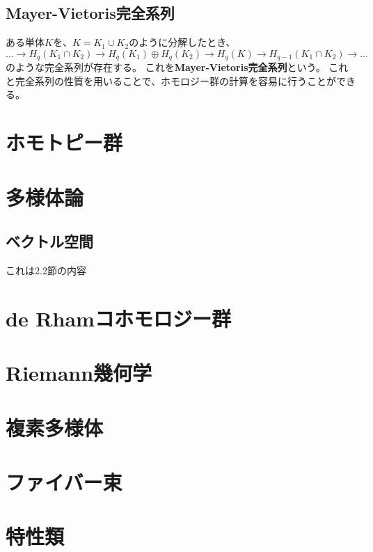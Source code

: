 \documentclass[a4paper]{jsreport}
\begin{document}
        \section{Mayer-Vietoris完全系列}
            ある単体$K$を、$K = K_1 \cup K_2$のように分解したとき、
            \begin{equation}
                \dots \rightarrow H_q(K_1 \cap K_2) \rightarrow H_q(K_1) \oplus H_q(K_2) \rightarrow H_q(K) \rightarrow H_{q-1}(K_1 \cap K_2) \rightarrow \dots
            \end{equation}
            のような完全系列が存在する。
            これを\textbf{Mayer-Vietoris完全系列}という。
            これと完全系列の性質を用いることで、ホモロジー群の計算を容易に行うことができる。

    \chapter{ホモトピー群}


    \chapter{多様体論}
        \section{ベクトル空間}
            これは2.2節の内容

    \chapter{de Rhamコホモロジー群}
    \chapter{Riemann幾何学}
    \chapter{複素多様体}
    \chapter{ファイバー束}
    \chapter{特性類}
\end{document}

